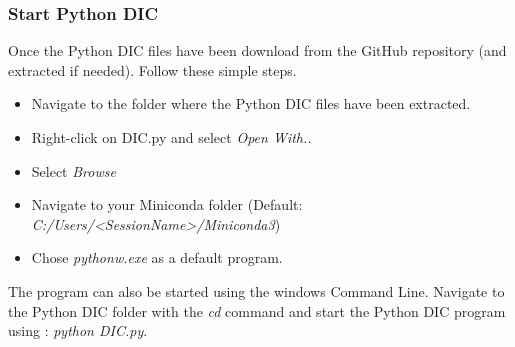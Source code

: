 \subsubsection{Start Python DIC}
\label{subs:Start Python DIC}
  \indent\indent Once the Python DIC files have been download from the GitHub repository (and extracted if needed). Follow these simple steps.
  \begin{itemize}
    \item Navigate to the folder where the Python DIC files have been extracted.
    \item Right-click on DIC.py and select \textit{Open With..}
    \item Select \textit{Browse}
    \item Navigate to your Miniconda folder (Default: \textit{C:/Users/\textless SessionName\textgreater /Miniconda3})
    \item Chose \textit{pythonw.exe} as a default program.
  \end{itemize}
  \newline
  \indent\indent The program can also be started using the windows Command Line. Navigate to the Python DIC folder with the \textit{cd} command and start the Python DIC program using : \textit{python DIC.py}.\\
  \newline
